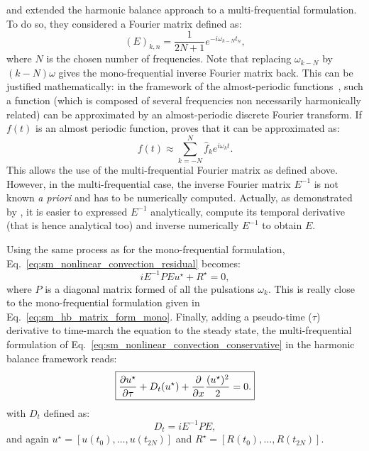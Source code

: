 \citet{Gopinath2007} and \citet{Ekici2007} 
extended the harmonic balance approach to
a multi-frequential formulation. To do so, they considered
a Fourier matrix defined as:
\begin{equation}
	(E)_{k,n} = \frac{1}{2N+1} e^{-i \omega_{k-N} t_n},
\end{equation}
where $N$ is the chosen number of frequencies.
Note that replacing $\omega_{k-N}$ by $(k - N) \omega$ gives
the mono-frequential inverse Fourier matrix back. 
This can be justified mathematically: in the
framework of the almost-periodic functions~\cite{Besicovitch1932},
such a function (which is composed of several
frequencies non necessarily harmonically related) can be approximated
by an almost-periodic
discrete Fourier transform. If $f(t)$ is an almost periodic function,
\citet{Besicovitch1932} proves that it can be approximated as:
\begin{equation}
	f(t) \approx \sum_{k=-N}^{N} \widehat{f}_k 
	e^{i \omega_k t}.
\end{equation}
This allows the use of the multi-frequential Fourier matrix as defined
above. However, in the multi-frequential case, the inverse Fourier matrix
$E^{-1}$ is not known \textit{a priori} 
and has to be numerically computed. Actually, as demonstrated by 
\citet{Gopinath2007}, it is easier to expressed $E^{-1}$ analytically,
compute its temporal derivative (that is hence analytical too) 
and inverse numerically $E^{-1}$ to obtain $E$.

Using the same process as for the mono-frequential formulation,
Eq.~\ref{eq:sm_nonlinear_convection_residual} becomes:
\begin{equation}
	i E^{-1} P E u^\star + R^\star = 0,
\end{equation}
where $P$ is a diagonal matrix formed of all the pulsations $\omega_k$.
This is really close to the mono-frequential formulation given
in Eq.~\ref{eq:sm_hb_matrix_form_mono}.
Finally, adding a pseudo-time ($\tau$) derivative 
to time-march the equation to the steady state,
the multi-frequential formulation of 
Eq.~\ref{eq:sm_nonlinear_convection_conservative} in the harmonic
balance framework reads:
\begin{equation}
	\fbox{$
	\displaystyle \frac{\partial u^\star}{\partial \tau} +
	D_t (u^\star) + 
	\displaystyle \frac{\partial}{\partial x}
		\frac{(u^\star)^2}{2} = 0.
	$}
\end{equation}
with $D_t$ defined as:
\begin{equation}
	D_t = i E^{-1} P E,
\end{equation}
and again $u^\star = [u(t_0), \ldots, u(t_{2N})]$ 
and $R^\star = [R(t_0), \ldots, R(t_{2N})]$.

